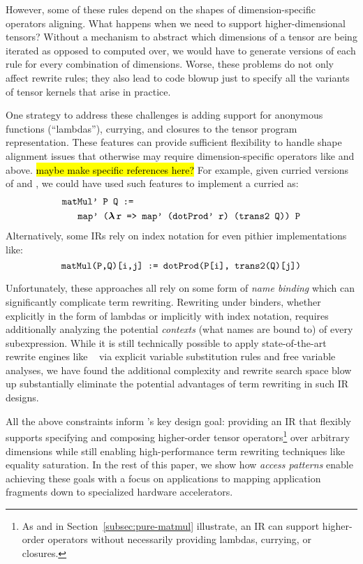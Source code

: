 However, some of these rules depend on the
  shapes of dimension-specific operators aligning.
What happens when we need to support
  higher-dimensional tensors?
Without a mechanism to abstract
  which dimensions of a tensor
  are being iterated as opposed to computed over,
  we would have to generate versions of
  each rule for every combination of dimensions.
Worse, these problems
  do not only affect rewrite rules;
  they also lead to code blowup just to
  specify all the variants of tensor kernels
  that arise in practice.

One strategy to address these challenges is
  adding support for anonymous functions (``lambdas''),
  currying, and closures to the 
  tensor program representation.
These features can provide sufficient
  flexibility to handle shape alignment
  issues that otherwise may require
  dimension-specific operators like
   and  above.
\hl{maybe make specific references here?}
For example, given curried versions
  of  and ,
  we could have used such features
  to implement a curried  as:
\begin{align*}
  & \mathrm{\texttt{matMul' P Q :=}} \\
  & \;\; \mathrm{\texttt{ \
      map' ($\boldsymbol\lambda\,$r =>\
        map' (dotProd' r) (trans2 Q)) P}}
\end{align*}
Alternatively, some IRs rely on index notation
  for even pithier implementations like:
$$
  \mathrm{\texttt{matMul(P,Q)[i,j] := dotProd(P[i], trans2(Q)[j])}}
$$

Unfortunately, these approaches all rely on some
  form of \textit{name binding} which can
  significantly complicate term rewriting.
Rewriting under binders,
  whether explicitly in the form of lambdas
  or implicitly with index notation,
  requires additionally analyzing the
  potential \textit{contexts}
  (what names are bound to)
  of every subexpression.
While it is still technically possible to
  apply state-of-the-art rewrite engines
  like \tcd{egg}~\cite{willsey2021egg}
  via explicit variable substitution rules and
  free variable analyses,
  we have found the additional complexity
  and rewrite search space blow up
  substantially eliminate the potential advantages
  of term rewriting in such IR designs.

All the above constraints inform \g's key design goal:
  providing an IR that flexibly supports specifying and
  composing higher-order tensor operators\footnote{
    As \tcd{map} and \tcd{mapAt2} in 
    Section~\ref{subsec:pure-matmul} illustrate,
    an IR can support higher-order operators without
    necessarily providing lambdas, currying, or closures.}
  over arbitrary dimensions while still enabling
  high-performance term rewriting techniques
  like equality saturation.
In the rest of this paper,
  we show how \textit{access patterns} enable achieving
  these goals with a focus on applications to
  mapping application fragments down to
  specialized hardware accelerators.

